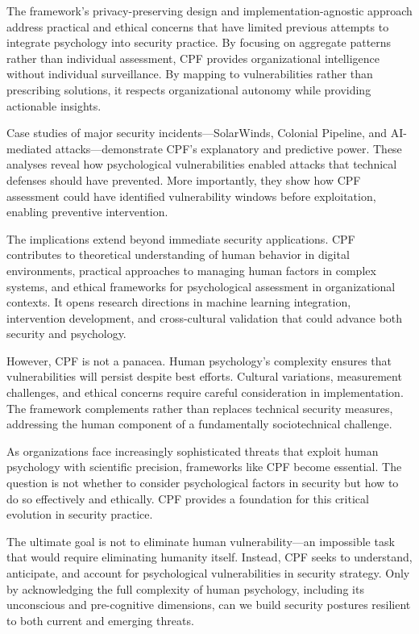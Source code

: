 \documentclass[11pt,a4paper]{article}
\begin{document}
The framework's privacy-preserving design and implementation-agnostic approach address practical and ethical concerns that have limited previous attempts to integrate psychology into security practice. By focusing on aggregate patterns rather than individual assessment, CPF provides organizational intelligence without individual surveillance. By mapping to vulnerabilities rather than prescribing solutions, it respects organizational autonomy while providing actionable insights.

Case studies of major security incidents—SolarWinds, Colonial Pipeline, and AI-mediated attacks—demonstrate CPF's explanatory and predictive power. These analyses reveal how psychological vulnerabilities enabled attacks that technical defenses should have prevented. More importantly, they show how CPF assessment could have identified vulnerability windows before exploitation, enabling preventive intervention.

The implications extend beyond immediate security applications. CPF contributes to theoretical understanding of human behavior in digital environments, practical approaches to managing human factors in complex systems, and ethical frameworks for psychological assessment in organizational contexts. It opens research directions in machine learning integration, intervention development, and cross-cultural validation that could advance both security and psychology.

However, CPF is not a panacea. Human psychology's complexity ensures that vulnerabilities will persist despite best efforts. Cultural variations, measurement challenges, and ethical concerns require careful consideration in implementation. The framework complements rather than replaces technical security measures, addressing the human component of a fundamentally sociotechnical challenge.

As organizations face increasingly sophisticated threats that exploit human psychology with scientific precision, frameworks like CPF become essential. The question is not whether to consider psychological factors in security but how to do so effectively and ethically. CPF provides a foundation for this critical evolution in security practice.

The ultimate goal is not to eliminate human vulnerability—an impossible task that would require eliminating humanity itself. Instead, CPF seeks to understand, anticipate, and account for psychological vulnerabilities in security strategy. Only by acknowledging the full complexity of human psychology, including its unconscious and pre-cognitive dimensions, can we build security postures resilient to both current and emerging threats.
\end{document}
